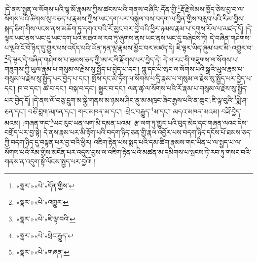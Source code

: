 །དེ་ནས་སྤྱན་ལ་སོགས་པའི་ལྷ་མོ་རྣམས་ཀྱིས་ཚངས་པའི་གནས་བཞིའི་:དོན་གྱི་\footnote{«སྣར་»«པེ་»དོན་གྱིས་}རྡོ་རྗེ་སེམས་ཁྱོད་ཅེས་བྱ་བ་ལ་སོགས་པའི་ཚིགས་སུ་བཅད་པ་རྣམས་ཀྱིས་ཡང་དག་པར་བསྐུལ་བས་བདག་ལ་བྱིན་གྱིས་བརླབ་པའི་རིམ་གྱིས་སྐད་ཅིག་གིས་ལངས་ནས་མཆོག་ཏུ་དགའ་བའི་རོ་མྱང་བར་བྱ་བའི་ཕྱིར་ཉམས་རྣམ་པ་དགུས་རོལ་པ་མཛད་དོ། །དེ་ལྟར་ཡང་ནས་ཡང་དུ་ཡང་དག་པའི་མཐའ་ལ་རབ་ཏུ་ཞུགས་ནས་ཡང་ནས་ཡང་དུ་བཞེངས་ཏེ། དེ་བཞིན་གཤེགས་པ་ལྔའི་ངོ་བོ་ཉིད་དུ་གྱུར་པས་འདོད་པའི་ཡོན་ཏན་ལྔ་རྣམས་མྱོང་བར་མཛད་དེ། ཇི་ལྟར་ཡིད་ཞུམ་པར་མི་:འགྱུར་བ་\footnote{«སྣར་»«པེ་»འགྱུར་}དེ་ལྟར་དེ་བཞིན་གཤེགས་པ་ཐམས་ཅད་ཀྱི་ཨ་ར་ལི་རྫོགས་པར་བྱེད་དེ། དེ་ལ་རང་གི་གཟུགས་ལ་སོགས་པ་གཟུགས་ཀྱི་ཡུལ་རྣམ་པ་གསུམ་ལ་རྗེས་སུ་སྤྱོད་པ་བྱེད་པ་དང་། གླུ་དང་པི་ཝང་ལ་སོགས་པའི་སྒྲའི་ཡུལ་རྣམ་པ་གསུམ་ལ་རྗེས་སུ་སྤྱོད་པར་བྱེད་པ་དང་། སྤོས་དང་མེ་ཏོག་ལ་སོགས་པ་དྲི་རྣམ་པ་གསུམ་ལ་རྗེས་སུ་སྤྱོད་པར་བྱེད་པ་དང་། ཁ་བ་དང་། ཚ་བ་དང་། བསྐ་བ་དང་། སྐྱུར་བ་དང་། ལན་ཚྭ་ལ་སོགས་པའི་རོ་རྣམ་པ་གསུམ་ལ་རྗེས་སུ་སྤྱོད་པར་བྱེད་དོ། །དེ་ནས་ལོ་བཅུ་དྲུག་མ་སྐྱེ་གནས་མ་ཉམས་ཤིང་ནུ་མ་མཁྲང་ཞིང་རྒྱས་པའི་ན་ཆུང་:ཇི་ལྟ་བུའི་\footnote{«སྣར་»«པེ་»ཇི་ལྟ་བའི་}སྨེ་ཤ་ཅན་དང་། བཙོ་བླག་མཁན་དང་། གར་མཁན་མ་དང་། :ཕྲེང་བརྒྱུད་\footnote{«སྣར་»«པེ་»ཕྲེང་རྒྱུད་}མ་དང་། མདའ་མཁན་མའམ། བཟོ་བྱེད་མའམ། :གཞན་གང་\footnote{«སྣར་»«པེ་»གཞན་}ཡང་རུང་ཡན་ལག་མི་དམན་པའམ། རྩ་ལག་ཏུ་གྱུར་པའི་བུད་མེད་དང་གཞན་ལའང་དེས་བགྲོད་པར་བྱ་སྟེ། དེ་ནས་རྣམ་པར་མི་རྟོག་པའི་བདག་ཉིད་ཅན་གྱི་རྣལ་འབྱོར་པས་བདག་ཉིད་དངོས་པོ་ཐམས་ཅད་ཀྱི་བདག་ཉིད་དུ་བསྟན་པར་བྱ་བའི་ཕྱིར། འཇིག་རྟེན་པས་སྨད་པའི་དམ་ཚིག་རྣམས་གང་ཡིན་པ་ལ་སྤྱད་པ་ལ་སོགས་པའི་རིམ་གྱིས་མངོན་པར་འདུས་བྱས་ལ་འཇིག་རྟེན་པའི་མཚན་མ་དམིགས་པ་སྤངས་ཏེ་རབ་ཏུ་གསང་བའི་གནས་ན་འདུག་སྟེ་ལོངས་སྤྱད་པར་བྱའོ། །
